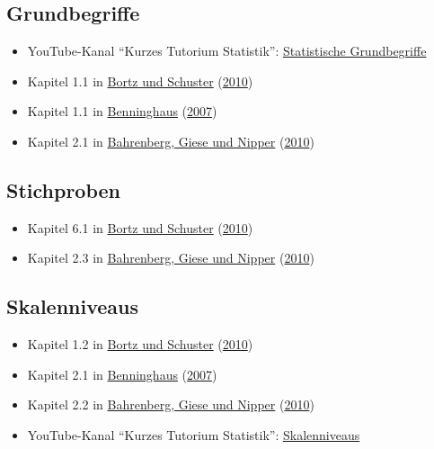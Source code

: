 \documentclass[
  11pt,
  ngerman,
  a4paper,
]{report}
\providecommand{\tightlist}{%
  \setlength{\itemsep}{0pt}\setlength{\parskip}{0pt}}
\begin{document}
\hypertarget{grundbegriffe}{%
\subsection{Grundbegriffe}\label{grundbegriffe}}

\begin{itemize}
\tightlist
\item
  YouTube-Kanal \enquote{Kurzes Tutorium Statistik}: \href{https://www.youtube.com/watch?v=bJsBcLjke3Q}{Statistische Grundbegriffe}
\item
  Kapitel 1.1 in \protect\hyperlink{ref-bortz}{Bortz und Schuster} (\protect\hyperlink{ref-bortz}{2010})
\item
  Kapitel 1.1 in \protect\hyperlink{ref-benninghaus}{Benninghaus} (\protect\hyperlink{ref-benninghaus}{2007})
\item
  Kapitel 2.1 in \protect\hyperlink{ref-bahrenberg}{Bahrenberg, Giese und Nipper} (\protect\hyperlink{ref-bahrenberg}{2010})
\end{itemize}

\hypertarget{stichproben}{%
\subsection{Stichproben}\label{stichproben}}

\begin{itemize}
\tightlist
\item
  Kapitel 6.1 in \protect\hyperlink{ref-bortz}{Bortz und Schuster} (\protect\hyperlink{ref-bortz}{2010})
\item
  Kapitel 2.3 in \protect\hyperlink{ref-bahrenberg}{Bahrenberg, Giese und Nipper} (\protect\hyperlink{ref-bahrenberg}{2010})
\end{itemize}

\hypertarget{skalenniveaus-1}{%
\subsection{Skalenniveaus}\label{skalenniveaus-1}}

\begin{itemize}
\tightlist
\item
  Kapitel 1.2 in \protect\hyperlink{ref-bortz}{Bortz und Schuster} (\protect\hyperlink{ref-bortz}{2010})
\item
  Kapitel 2.1 in \protect\hyperlink{ref-benninghaus}{Benninghaus} (\protect\hyperlink{ref-benninghaus}{2007})
\item
  Kapitel 2.2 in \protect\hyperlink{ref-bahrenberg}{Bahrenberg, Giese und Nipper} (\protect\hyperlink{ref-bahrenberg}{2010})
\item
  YouTube-Kanal \enquote{Kurzes Tutorium Statistik}: \href{https://www.youtube.com/watch?v=TV4tTtW4UBU}{Skalenniveaus}
\end{itemize}
\end{document}
